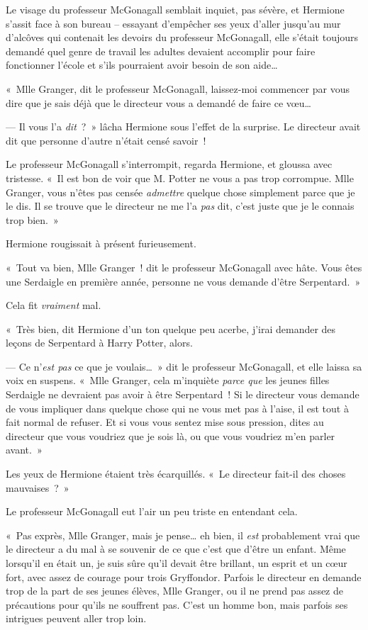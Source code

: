Le visage du professeur McGonagall semblait inquiet, pas sévère, et Hermione s'assit face à son bureau -- essayant d'empêcher ses yeux d'aller jusqu'au mur d'alcôves qui contenait les devoirs du professeur McGonagall, elle s'était toujours demandé quel genre de travail les adultes devaient accomplir pour faire fonctionner l'école et s'ils pourraient avoir besoin de son aide…

«~Mlle Granger, dit le professeur McGonagall, laissez-moi commencer par vous dire que je sais déjà que le directeur vous a demandé de faire ce vœu…

--- Il vous l'a \emph{dit}~?~»
lâcha Hermione sous l'effet de la surprise.
Le directeur avait dit que personne d'autre n'était censé savoir~!

Le professeur McGonagall s'interrompit, regarda Hermione, et gloussa avec tristesse.
«~Il est bon de voir que M. Potter ne vous a pas trop corrompue.
Mlle Granger, vous n'êtes pas censée \emph{admettre} quelque chose simplement parce que je le dis.
Il se trouve que le directeur ne me l'a \emph{pas} dit, c'est juste que je le connais trop bien.~»

Hermione rougissait à présent furieusement.

«~Tout va bien, Mlle Granger~! dit le professeur McGonagall avec hâte.
Vous êtes une Serdaigle en première année, personne ne vous demande d'être Serpentard.~»

Cela fit \emph{vraiment} mal.

«~Très bien, dit Hermione d'un ton quelque peu acerbe, j'irai demander des leçons de Serpentard à Harry Potter, alors.

--- Ce n'\emph{est pas} ce que je voulais…~»
dit le professeur McGonagall, et elle laissa sa voix en suspens.
«~Mlle Granger, cela m'inquiète \emph{parce que} les jeunes filles Serdaigle ne devraient pas avoir à être Serpentard~!
Si le directeur vous demande de vous impliquer dans quelque chose qui ne vous met pas à l'aise, il est tout à fait normal de refuser.
Et si vous vous sentez mise sous pression, dites au directeur que vous voudriez que je sois là, ou que vous voudriez m'en parler avant.~»

Les yeux de Hermione étaient très écarquillés.
«~Le directeur fait-il des choses mauvaises~?~»

Le professeur McGonagall eut l'air un peu triste en entendant cela.

«~Pas exprès, Mlle Granger, mais je pense… eh bien, il \emph{est} probablement vrai que le directeur a du mal à se souvenir de ce que c'est que d'être un enfant.
Même lorsqu'il en était un, je suis sûre qu'il devait être brillant, un esprit et un cœur fort, avec assez de courage pour trois Gryffondor.
Parfois le directeur en demande trop de la part de ses jeunes élèves, Mlle Granger, ou il ne prend pas assez de précautions pour qu'ils ne souffrent pas.
C'est un homme bon, mais parfois ses intrigues peuvent aller trop loin.

